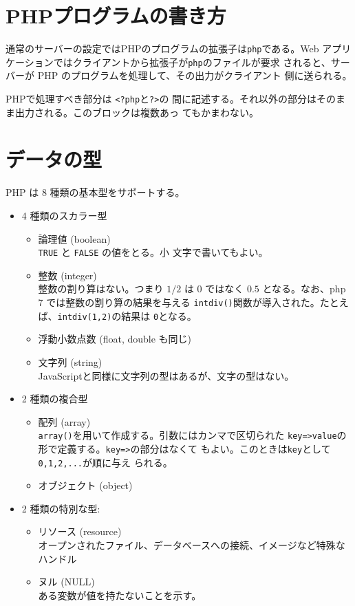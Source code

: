 \section{PHPプログラムの書き方}
通常のサーバーの設定ではPHPのプログラムの拡張子は\texttt{php}である。Web
アプリケーションではクライアントから拡張子が\texttt{php}のファイルが要求
されると、サーバーが PHP のプログラムを処理して、その出力がクライアント
側に送られる。

PHPで処理すべき部分は \texttt{<?php}と\texttt{?>}の
間に記述する。それ以外の部分はそのまま出力される。このブロックは複数あっ
てもかまわない。
\section{データの型}
PHP は 8 種類の基本型をサポートする。
\begin{itemize}
 \item 4 種類のスカラー型
 \begin{itemize}
  \item 論理値 (boolean)\\\texttt{TRUE} と \texttt{FALSE} の値をとる。小
	文字で書いてもよい。
  \item 整数 (integer)\\整数の割り算はない。つまり $1/2$ は $0$ ではなく
	$0.5$ となる。{なお、php 7 では整数の割り算の結果を与える
        \Verb+intdiv()+関数が導入された。たとえば、\Verb+intdiv(1,2)+の結果は
        \Verb+0+となる。}
  \item 浮動小数点数 (float, double も同じ)
  \item 文字列 (string)\\
JavaScriptと同様に文字列の型はあるが、文字の型はない。
 \end{itemize}
 \item 2 種類の複合型
 \begin{itemize}
  \item 配列 (array)\\
\texttt{array()}を用いて作成する。引数にはカンマで区切られた
	\texttt{key=>value}の形で定義する。\texttt{key=>}の部分はなくて
	もよい。このときは\texttt{key}として\texttt{0,1,2,...}が順に与え
	られる。
  \item オブジェクト (object)
 \end{itemize}
 \item 2 種類の特別な型:
\begin{itemize}
 \item リソース (resource)\\
オープンされたファイル、データベースへの接続、イメージなど特殊なハンドル
       
 \item ヌル (NULL)\\
ある変数が値を持たないことを示す。
\end{itemize}
\end{itemize}
